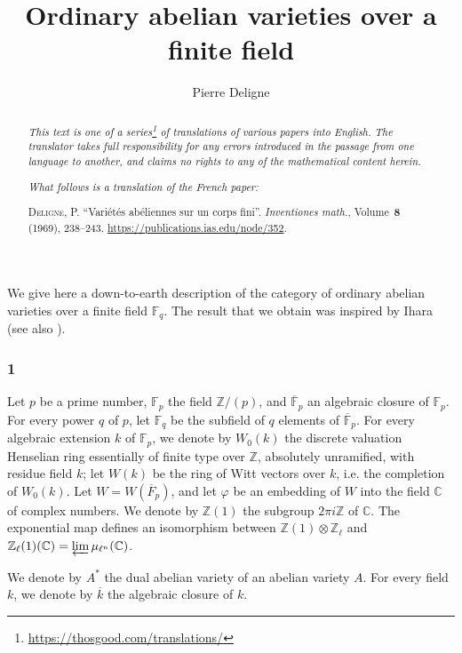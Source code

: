 \documentclass{article}
\title{Ordinary abelian varieties over a finite field}
\author{Pierre Deligne}
\date{}
\newcommand{\FF}{\mathbb{F}}
\newcommand{\ZZ}{\mathbb{Z}}
\newcommand{\CC}{\mathbb{C}}
\newcommand{\oldpage}[1]{\marginpar{\footnotesize$\Big\vert$ \textit{p.~#1}}}
\begin{document}
\maketitle
\thispagestyle{fancy}

\renewcommand{\abstractname}{Translator's note.}

\begin{abstract}
  \renewcommand*{\thefootnote}{\fnsymbol{footnote}}
  \emph{This text is one of a series\footnote{\url{https://thosgood.com/translations/}} of translations of various papers into English.}
  \emph{The translator takes full responsibility for any errors introduced in the passage from one language to another, and claims no rights to any of the mathematical content herein.}
  
  \emph{What follows is a translation of the French paper:}

  \medskip\noindent
  \textsc{Deligne, P.}
  ``Variétés abéliennes sur un corps fini''.
  \emph{Inventiones math.}, Volume~\textbf{8} (1969), 238--243.
  {\url{https://publications.ias.edu/node/352}}.
\end{abstract}

\setcounter{footnote}{0}



\oldpage{238}
We give here a down-to-earth description of the category of ordinary abelian varieties over a finite field $\FF_q$.
The result that we obtain was inspired by Ihara~\cite[ch.~V]{2} (see also \cite{3}).


\subsubsection*{1}
\label{1}
Let $p$ be a prime number, $\FF_p$ the field $\ZZ/(p)$, and $\overline{\FF}_p$ an algebraic closure of $\FF_p$.
For every power $q$ of $p$, let $\FF_q$ be the subfield of $q$ elements of $\overline{\FF}_p$.
For every algebraic extension $k$ of $\FF_p$, we denote by $W_0(k)$ the discrete valuation Henselian ring essentially of finite type over $\ZZ$, absolutely unramified, with residue field $k$;
let $W(k)$ be the ring of Witt vectors over $k$, i.e. the completion of $W_0(k)$.
Let $W=W(\overline{F}_p)$, and let $\varphi$ be an embedding of $W$ into the field $\CC$ of complex numbers.
We denote by $\ZZ(1)$ the subgroup $2\pi i\ZZ$ of $\CC$.
The exponential map defines an isomorphism between $\ZZ(1)\otimes\ZZ_\ell$ and $\ZZ_\ell(1)(\CC)=\varprojlim\mu_{\ell^n}(\CC)$.

We denote by $A^*$ the dual abelian variety of an abelian variety $A$.
For every field $k$, we denote by $\overline{k}$ the algebraic closure of $k$.
\end{document}
